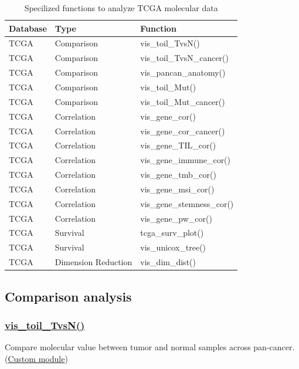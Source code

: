 \documentclass[
]{book}
\begin{document}
\begin{table}

\caption{\label{tab:analyze-tcga-func}Specilized functions to analyze TCGA molecular data}
\centering
\begin{tabular}[t]{lll}
\toprule
Database & Type & Function\\
\midrule
TCGA & Comparison & vis\_toil\_TvsN()\\
TCGA & Comparison & vis\_toil\_TvsN\_cancer()\\
TCGA & Comparison & vis\_pancan\_anatomy()\\
TCGA & Comparison & vis\_toil\_Mut()\\
TCGA & Comparison & vis\_toil\_Mut\_cancer()\\
\addlinespace
TCGA & Correlation & vis\_gene\_cor()\\
TCGA & Correlation & vis\_gene\_cor\_cancer()\\
TCGA & Correlation & vis\_gene\_TIL\_cor()\\
TCGA & Correlation & vis\_gene\_immune\_cor()\\
TCGA & Correlation & vis\_gene\_tmb\_cor()\\
\addlinespace
TCGA & Correlation & vis\_gene\_msi\_cor()\\
TCGA & Correlation & vis\_gene\_stemness\_cor()\\
TCGA & Correlation & vis\_gene\_pw\_cor()\\
TCGA & Survival & tcga\_surv\_plot()\\
TCGA & Survival & vis\_unicox\_tree()\\
\addlinespace
TCGA & Dimension Reduction & vis\_dim\_dist()\\
\bottomrule
\end{tabular}
\end{table}

\subsection{Comparison analysis}\label{comparison-analysis}

\subsubsection{\texorpdfstring{\href{https://openbiox.github.io/UCSCXenaShiny/reference/vis_toil_TvsN.html}{vis\_toil\_TvsN()}}{vis\_toil\_TvsN()}}\label{vis-toil-TvsN}

Compare molecular value between tumor and normal samples across pan-cancer. (\hyperref[m-vis_toil_TvsN]{Custom module})
\end{document}
